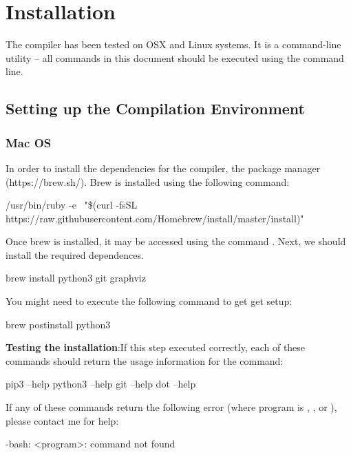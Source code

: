 \chapter{Installation}

The \legno compiler has been tested on OSX and Linux systems. It is a
command-line utility -- all commands in this document should be executed using the command line. 


\section{Setting up the Compilation Environment}
\subsection{Mac OS}


In order to install the dependencies for the \legno compiler, the  package manager (https://brew.sh/). Brew is installed using the following command:

\begin{snippet}
  /usr/bin/ruby -e \
  "\$(curl -fsSL https://raw.githubusercontent.com/Homebrew/install/master/install)"
\end{snippet}

 Once brew is installed, it may be accessed using the command . Next,
 we should install the required dependences. 

\begin{snippet}
  brew install python3 git graphviz
\end{snippet}

You might need to execute the following command to get get  setup:

\begin{snippet}
  brew postinstall python3 
\end{snippet}

\noindent\textbf{Testing the installation}:If this step executed correctly, each
of these commands should return the usage information for the command: 

\begin{snippet}
  pip3 --help
  python3 --help
  git --help
  dot --help
\end{snippet}

If any of these commands return the following error (where program is
\tx{pip3}, \tx{python3}, \tx{git} or \tx{dot}), please contact me for help:

\begin{snippet}
-bash: <program>: command not found
\end{snippet}


